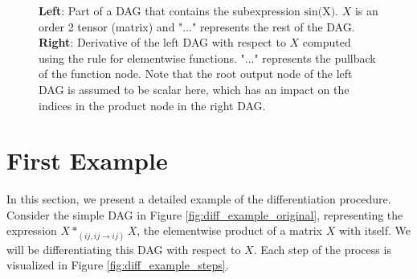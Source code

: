 \documentclass[12pt, a4paper]{report}
\begin{document}
\begin{figure}
    \centering
    \begin{minipage}{7cm}
        \centering
    \end{minipage}
    \begin{minipage}{7cm}
        \centering
    \end{minipage}
    \caption{\textbf{Left}: Part of a DAG that contains the subexpression $\text{sin(X)}$. $X$ is an order 2 tensor (matrix) and "..." represents the rest of the DAG. \textbf{Right}: Derivative of the left DAG with respect to $X$ computed using the rule for elementwise functions. "..." represents the pullback of the function node. Note that the root output node of the left DAG is assumed to be scalar here, which has an impact on the indices in the product node in the right DAG.}
    \label{fig:func_rule}
\end{figure}

\FloatBarrier
\section{First Example}
In this section, we present a detailed example of the differentiation procedure.
Consider the simple DAG in Figure \ref{fig:diff_example_original}, representing the expression $X *_{(ij,ij \rightarrow ij)} X$, the elementwise product of a matrix $X$ with itself.
We will be differentiating this DAG with respect to $X$.
Each step of the process is visualized in Figure \ref{fig:diff_example_steps}.
\end{document}
